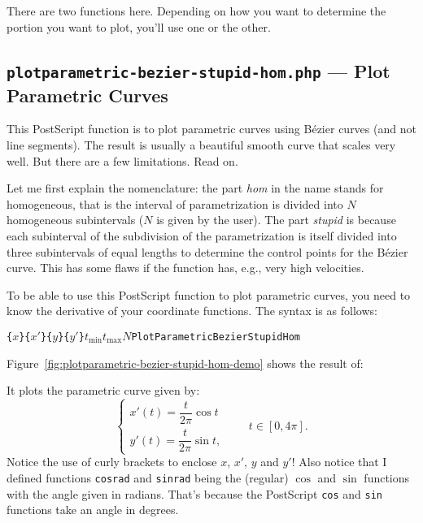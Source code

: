 \documentclass[10pt,a4paper]{scrartcl}
\newcommand\PS{PostScript}
\begin{document}
There are two functions here. Depending on how you want to determine the portion
you want to plot, you'll use one or the other.

\subsection{\texttt{plotparametric-bezier-stupid-hom.php} --- Plot Parametric Curves}
\label{ssec:plotparametric-bezier-stupid-hom.php}
This \PS{} function is to plot parametric curves using B\'ezier curves (and not
line segments). The result is usually a beautiful smooth curve that scales very
well. But there are a few limitations. Read on.

Let me first explain the nomenclature: the part \emph{hom} in the name stands
for homogeneous, that is the interval of parametrization is divided into $N$
homogeneous subintervals ($N$ is given by the user). The part \emph{stupid} is
because each subinterval of the subdivision of the parametrization is itself
divided into three subintervals of equal lengths to determine the control
points for the B\'ezier curve. This has some flaws if the function has, e.g.,
very high velocities.

To be able to use this \PS{} function to plot parametric curves, you need to
know the derivative of your coordinate functions. The syntax is as follows:
\begin{center}
\texttt{\{}$x$\texttt{\}}\quad\texttt{\{}$x'$\texttt{\}}\quad\texttt{\{}$y$\texttt{\}}\quad\texttt{\{}$y'$\texttt{\}}\quad$t_{\text{min}}$\quad$t_{\text{max}}$\quad$N$\quad\texttt{PlotParametricBezierStupidHom}
\end{center}

Figure~\ref{fig:plotparametric-bezier-stupid-hom-demo} shows the result of:

It plots the parametric curve given by:
\[\begin{cases}
x'(t)=\dfrac t{2\pi}\cos t\\
y'(t)=\dfrac t{2\pi}\sin t,
\end{cases}\qquad t\in[0,4\pi].\]
Notice the use of curly brackets to enclose $x$, $x'$, $y$ and $y'$! Also notice that I
defined functions \texttt{cosrad} and \texttt{sinrad} being the (regular)
$\cos$ and $\sin$ functions with the angle given in radians. That's because the
\PS{} \texttt{cos} and \texttt{sin} functions take an angle in degrees.
\end{document}
